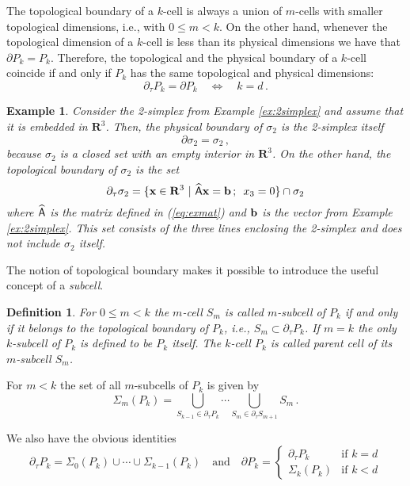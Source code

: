 \documentclass[pdf,12pt,relaxed]{SANDreport}
\newtheorem{defin}{Definition}
\newtheorem{exam}{Example}
\begin{document}
    The topological boundary of a $k$-cell is always a union of $m$-cells with smaller topological dimensions, i.e., with 
    $0\le m < k$. On the other hand, whenever the topological dimension of a $k$-cell is less than its physical dimensions we have that $\partial{P_k} = P_k$. Therefore, the topological and the physical boundary of a $k$-cell coincide if and only if $P_k$ has the same topological and physical dimensions:
    $$
    \partial_\tau P_k = \partial P_k \quad \Leftrightarrow \quad k=d \,.
    $$
    
    \begin{exam}\label{ex:bdry-compare}
    \emph{
    Consider the 2-simplex from Example \ref{ex:2simplex} and assume that it is embedded in $\mathbf{R}^3$. Then, the physical boundary of $\sigma_2$ is the 2-simplex itself 
    $$
    \partial\sigma_2 = \sigma_2 \,,
    $$
    because $\sigma_2$ is a closed set with an empty interior in $\mathbf{R}^3$. On the other hand, the 
    topological boundary of $\sigma_2$ is the set
    $$
    \partial_\tau \sigma_2 = \{ {\bf x} \in {\bf R}^3\,\,|\,\, \widehat{\sf A} {\bf x} = {\bf b}\,;\,\,\, x_3 = 0 \}\cap \sigma_2
    $$
    where $\widehat{\sf A}$ is the matrix defined in (\ref{eq:exmat}) and ${\bf b}$ is the vector from Example \ref{ex:2simplex}.
    This set consists of the three lines enclosing the 2-simplex and does not include $\sigma_2$ itself.
    }
    \end{exam}
    
    The notion of topological boundary makes it possible to introduce the useful concept of a \emph{subcell}.
         
    \begin{defin}\label{def:subcell}
    For $0 \le m < k$ the $m$-cell $S_m$ is called $m$-subcell of $P_k$ if and only if it belongs to the topological boundary of $P_k$, i.e., $S_m\subset\partial_\tau{P_k}$. If $m=k$ the only $k$-subcell of $P_k$ is defined to be $P_k$ itself. The $k$-cell $P_k$ is called parent cell of its $m$-subcell $S_m$. 
    \end{defin}
    
    For $m<k$ the set of all $m$-subcells of $P_k$ is given by
    \begin{equation}\label{eq:m-subs}
    \Sigma_m(P_k) = \bigcup_{S_{k-1}\in\partial_\tau P_k} \cdots \bigcup_{S_{m}\in\partial_\tau S_{m+1}} S_m \,.
    \end{equation}
    
    We also have the obvious identities
    $$
    \partial_\tau P_k = \Sigma_{0}(P_k)\cup \cdots \cup \Sigma_{k-1}(P_k)
    \quad\mbox{and}\quad
    \partial P_k =
    \left\{ 
    \begin{array}{rl} 
    \displaystyle \partial_\tau P_k & \mbox{if $k=d$} \\[1ex]
    \displaystyle \Sigma_k(P_k)    & \mbox{if $k<d$}
    \end{array}
    \right.
    $$
    
\end{document}
